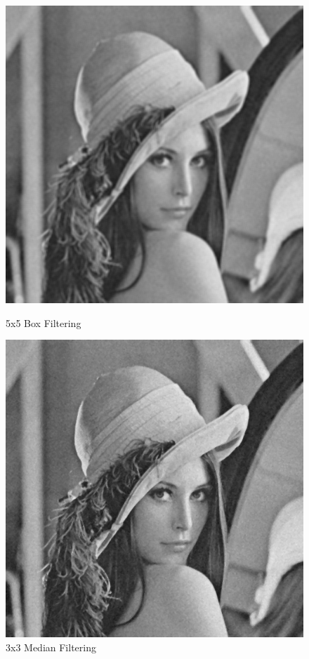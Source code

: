 \documentclass{article}
\begin{document}
\begin{figure}[H]
  \includegraphics[width=\linewidth]{img/g10_box_5x5.png}
  \caption{5x5 Box Filtering}\label{fig:g10_box_5x5}
\endminipage\hfill
{}
  \includegraphics[width=\linewidth]{img/g10_median_3x3.png}
  \caption{3x3 Median Filtering}\label{fig:g10_median_3x3}
\endminipage\hfill
\end{figure}
\end{document}
